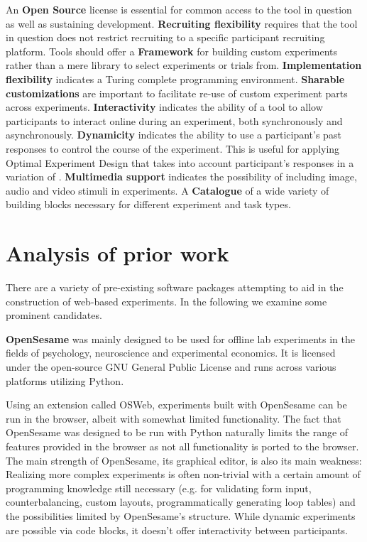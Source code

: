 \documentclass[a4paper,10pt]{paper}
\begin{document}
An \textbf{Open Source} license is essential for common access to the tool in question as well as sustaining development. \textbf{Recruiting flexibility} requires that the tool in question does not restrict recruiting to a specific participant recruiting platform. Tools should offer a \textbf{Framework} for building custom experiments rather than a mere library to select experiments or trials from. \textbf{Implementation flexibility} indicates a Turing complete programming environment. \textbf{Sharable customizations} are important to facilitate re-use of custom experiment parts across experiments. \textbf{Interactivity} indicates the ability of a tool to allow participants to interact online during an experiment, both synchronously and asynchronously. \textbf{Dynamicity} indicates the ability to use a participant's past responses to control the course of the experiment. This is useful for applying Optimal Experiment Design that takes into account participant's responses in a variation of \citet{Ouyang2016}. \textbf{Multimedia support} indicates the possibility of including image, audio and video stimuli in experiments. A \textbf{Catalogue} of a wide variety of building blocks necessary for different experiment and task types.

\section{Analysis of prior work}
There are a variety of pre-existing software packages attempting to aid in the construction of web-based experiments. In the following we examine some prominent candidates.

\textbf{OpenSesame} \citep{Mathot2012} was mainly designed to be used for offline lab experiments in the fields of psychology, neuroscience and experimental economics. It is licensed under the open-source GNU General Public License and runs across various platforms utilizing Python.

Using an extension called OSWeb, experiments built with OpenSesame can be run in the browser, albeit with somewhat limited functionality. The fact that OpenSesame was designed to be run with Python naturally limits the range of features provided in the browser as not all functionality is ported to the browser. The main strength of OpenSesame, its graphical editor, is also its main weakness: Realizing more complex experiments is often non-trivial with a certain amount of programming knowledge still necessary (e.g. for validating form input, counterbalancing, custom layouts, programmatically generating loop tables) and the possibilities limited by OpenSesame's structure. While dynamic experiments are possible via code blocks, it doesn't offer interactivity between participants.
\end{document}
